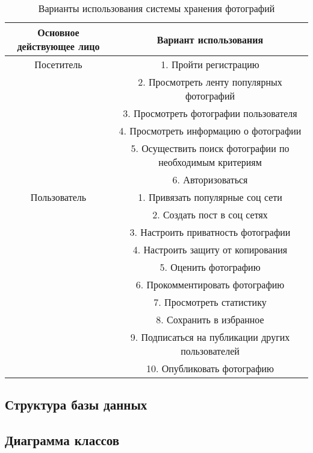 \begin{table}[H]
  \caption{Варианты использования системы хранения фотографий}\label{use-case-table}
  \begin{tabular}{|c|c|}
  \hline Основное действующее лицо & Вариант использования \\
  \hline  Посетитель & 1. Пройти регистрацию \\
  \hline   & 2. Просмотреть ленту популярных фотографий \\
  \hline   & 3. Просмотреть фотографии пользователя \\
  \hline   & 4. Просмотреть информацию о фотографии \\
  \hline   & 5. Осуществить поиск фотографии по необходимым критериям \\
  \hline   & 6. Авторизоваться \\
  \hline  Пользователь & 1. Привязать популярные соц сети \\
  \hline   & 2. Создать пост в соц сетях \\
  \hline   & 3. Настроить приватность фотографии \\
  \hline   & 4. Настроить защиту от копирования \\
  \hline   & 5. Оценить фотографию \\
  \hline   & 6. Прокомментировать фотографию \\
  \hline   & 7. Просмотреть статистику \\
  \hline   & 8. Сохранить в избранное \\
  \hline   & 9. Подписаться на публикации других пользователей \\
  \hline   & 10. Опубликовать фотографию \\
  \hline
  \end{tabular}
\end{table}

\subsection{Структура базы данных}
\subsection{Диаграмма классов}
\clearpage